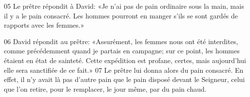 

05 Le prêtre répondit à David: «Je n’ai pas de pain ordinaire sous la main, mais il y a le pain consacré. Les hommes pourront en manger s’ils se sont gardés de rapports avec les femmes.»

06 David répondit au prêtre: «Assurément, les femmes nous ont été interdites, comme précédemment quand je partais en campagne; sur ce point, les hommes étaient en état de sainteté. Cette expédition est profane, certes, mais aujourd’hui elle sera sanctifiée de ce fait.»
07 Le prêtre lui donna alors du pain consacré. En effet, il n’y avait là pas d’autre pain que le pain disposé devant le Seigneur, celui que l’on retire, pour le remplacer, le jour même, par du pain chaud.
